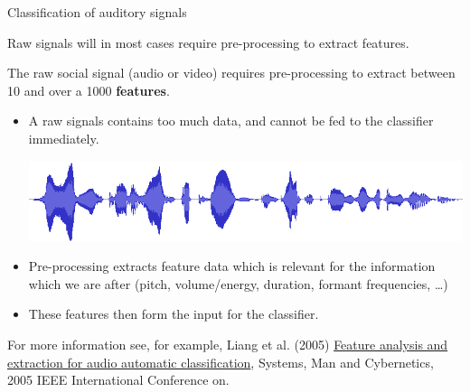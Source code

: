 \documentclass[compress]{beamer}
\begin{document}
\begin{frame}{Classification of auditory signals}

    Raw signals will in most cases require pre-processing to extract
features.

The raw social signal (audio or video) requires pre-processing to
extract between 10 and over a 1000 \textbf{features}.

\begin{itemize}

    \item A raw signals contains too much data, and cannot be fed to the
      classifier immediately.

        \begin{center}
            \includegraphics[width=0.5\linewidth]{rawaudio}
        \end{center}

    \item Pre-processing extracts feature data which is relevant for the
  information which we are after (pitch, volume/energy, duration,
  formant frequencies, \ldots{})
    \item These features then form the input for the classifier.
\end{itemize}

    {\footnotesize
For more information see, for example, Liang et al. (2005)
\href{http://ieeexplore.ieee.org/xpls/icp.jsp?arnumber=1571239}{Feature
analysis and extraction for audio automatic classification}, Systems,
Man and Cybernetics, 2005 IEEE International Conference on.
    }


\end{frame}
\end{document}
